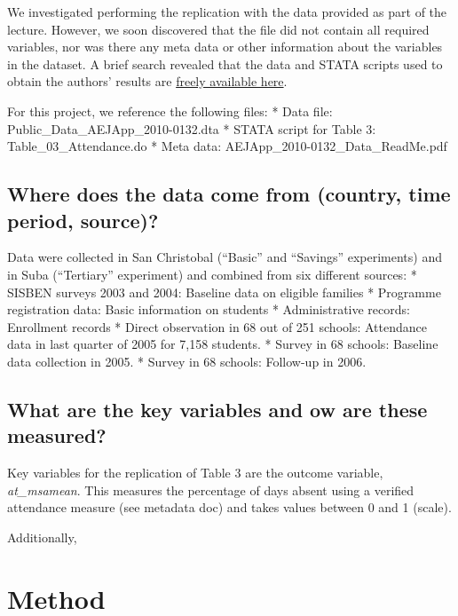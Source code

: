 \documentclass[
]{article}
\begin{document}
We investigated performing the replication with the data provided as
part of the lecture. However, we soon discovered that the file did not
contain all required variables, nor was there any meta data or other
information about the variables in the dataset. A brief search revealed
that the data and STATA scripts used to obtain the authors' results are
\href{https://www.openicpsr.org/openicpsr/project/113783/version/V1/view?path=/openicpsr/113783/fcr:versions/V1/AEJApp_2010-0132_Data\&type=folder}{freely
available here}.

For this project, we reference the following files: * Data file:
Public\_Data\_AEJApp\_2010-0132.dta * STATA script for Table 3:
Table\_03\_Attendance.do * Meta data:
AEJApp\_2010-0132\_Data\_ReadMe.pdf

\hypertarget{where-does-the-data-come-from-country-time-period-source}{%
\subsection{Where does the data come from (country, time period,
source)?}\label{where-does-the-data-come-from-country-time-period-source}}

Data were collected in San Christobal (``Basic'' and ``Savings''
experiments) and in Suba (``Tertiary'' experiment) and combined from six
different sources: * SISBEN surveys 2003 and 2004: Baseline data on
eligible families * Programme registration data: Basic information on
students * Administrative records: Enrollment records * Direct
observation in 68 out of 251 schools: Attendance data in last quarter of
2005 for 7,158 students. * Survey in 68 schools: Baseline data
collection in 2005. * Survey in 68 schools: Follow-up in 2006.

\hypertarget{what-are-the-key-variables-and-ow-are-these-measured}{%
\subsection{What are the key variables and ow are these
measured?}\label{what-are-the-key-variables-and-ow-are-these-measured}}

Key variables for the replication of Table 3 are the outcome variable,
\emph{at\_msamean}. This measures the percentage of days absent using a
verified attendance measure (see metadata doc) and takes values between
0 and 1 (scale).

Additionally,

\hypertarget{method}{%
\section{Method}\label{method}}
\end{document}
